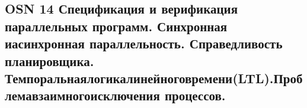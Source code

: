 \subsection{OSN 14 Спецификация и верификация параллельных программ. Синхронная
иасинхронная параллельность. Справедливость планировщика.
Темпоральнаялогикалинейноговремени(LTL).Проблемавзаимногоисключения
процессов.}

